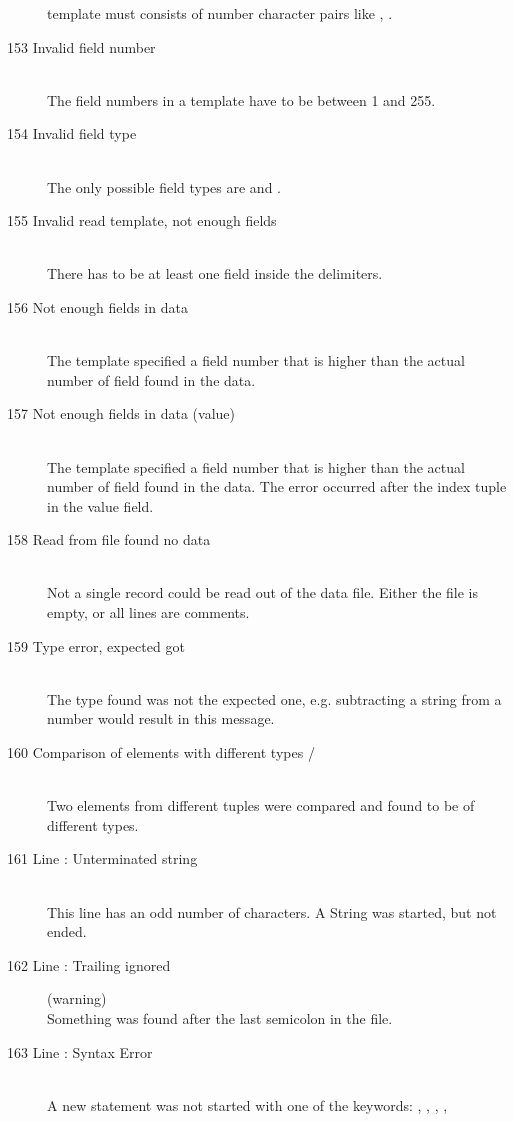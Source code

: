 \begin{description}
  template must consists of number character pairs like , .
\item[153 Invalid field number \code{xxx}]\ \\
  The field numbers in a template have to be between 1 and 255.
\item[154 Invalid field type \code{xxx}]\ \\
  The only possible field types are  and .
\item[155 Invalid read template, not enough fields]\ \\
  There has to be at least one field inside the delimiters.
\item[156 Not enough fields in data]\ \\
  The template specified a field number that is higher than the actual
  number of field found in the data. 
\item[157 Not enough fields in data (value)]\ \\
  The template specified a field number that is higher than the actual
  number of field found in the data. The error occurred after the 
  index tuple in the value field.
\item[158 Read from file found no data]\ \\
  Not a single record could be read out of the data file. Either the
  file is empty, or all lines are comments.
%
%  
\item[159 Type error, expected \code{xxx} got \code{yyy}]\ \\
  The type found was not the expected one, e.g. subtracting 
  a string from a number would result in this message.
%
% 
\item[160 Comparison of elements with different types \code{xxx} /
  \code{yyy}]\ \\
  Two elements from different tuples were compared and found to be 
  of different types. 
%
%
\item[161 Line \code{xxx}: Unterminated string]\ \\
  This line has an odd number of  characters. 
  A String was started, but not ended.
\item[162 Line \code{xxx}: Trailing \code{"yyy"} ignored] (warning)\ \\
  Something was found after the last semicolon in the file.
\item[163 Line \code{xxx}: Syntax Error]\ \\
  A new statement was not started with one of the keywords:
  , , , , 

\end{description}
